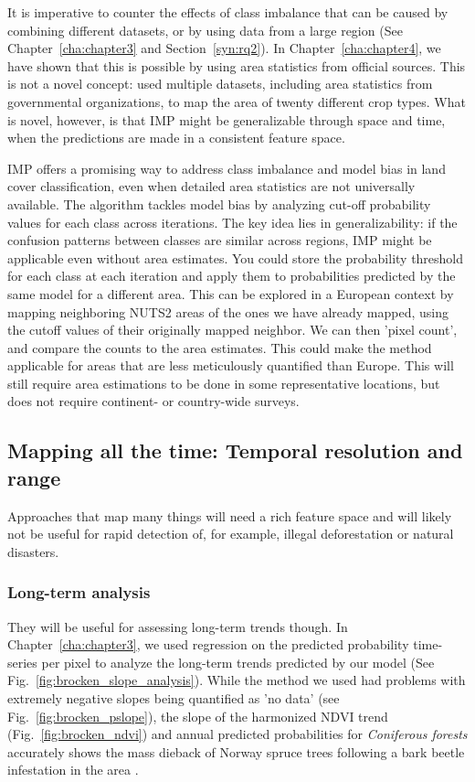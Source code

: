         It is imperative to counter the effects of class imbalance that can be caused by combining different datasets, or by using data from a large region (See Chapter\@~\ref{cha:chapter3} and Section\@~\ref{syn:rq2}). In Chapter\@~\ref{cha:chapter4}, we have shown that this is possible by using area statistics from official sources. This is not a novel concept: \citet{you2014generating} used multiple datasets, including area statistics from governmental organizations, to map the area of twenty different crop types. What is novel, however, is that IMP might be generalizable through space and time, when the predictions are made in a consistent feature space.

        IMP offers a promising way to address class imbalance and model bias in land cover classification, even when detailed area statistics are not universally available. The algorithm tackles model bias by analyzing cut-off probability values for each class across iterations. The key idea lies in generalizability: if the confusion patterns between classes are similar across regions, IMP might be applicable even without area estimates. You could store the probability threshold for each class at each iteration and apply them to probabilities predicted by the same model for a different area. This can be explored in a European context by mapping neighboring NUTS2 areas of the ones we have already mapped, using the cutoff values of their originally mapped neighbor. We can then 'pixel count', and compare the counts to the area estimates. This could make the method applicable for areas that are less meticulously quantified than Europe. This will still require area estimations to be done in some representative locations, but does not require continent- or country-wide surveys. 
        
    \subsection{Mapping all the time: Temporal resolution and range}
        \label{syn:allthetime}

        Approaches that map many things will need a rich feature space and will likely not be useful for rapid detection of, for example, illegal deforestation or natural disasters. 

        \subsubsection{Long-term analysis}
        They will be useful for assessing long-term trends though. In Chapter\@~\ref{cha:chapter3}, we used regression on the predicted probability time-series per pixel to analyze the long-term trends predicted by our model (See Fig.\@~\ref{fig:brocken_slope_analysis}). While the method we used had problems with extremely negative slopes being quantified as 'no data' (see Fig.\@~\ref{fig:brocken_pslope}), the slope of the harmonized NDVI trend (Fig.\@~\ref{fig:brocken_ndvi}) and annual predicted probabilities for \textit{Coniferous forests} accurately shows the mass dieback of Norway spruce trees following a bark beetle infestation in the area \citep{meyer2017matter}.


